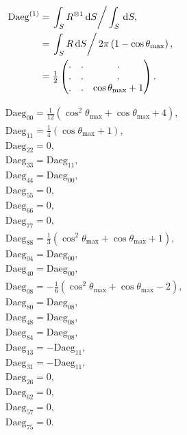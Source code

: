 \documentclass[a4paper,11pt,twoside,openright]{book}
\def\lthtmlcheckvsize{\ifdim\ht\sizebox<\vsize 
  \ifdim\wd\sizebox<\hsize\expandafter\hfill\fi \expandafter\vfill
  \else\expandafter\vss\fi}%
\begin{document}
{\newpage\clearpage
\setcounter{equation}{35}
%
\begin{subequations}\begin{align}
\textrm{Daeg}^{(1)}&= \left. \int_S R^{\otimes 1} \,\mathrm{d}S \right / \int_S \,\mathrm{d}S , \\
&= \left. \int_S R \,\mathrm{d}S \right / 2\pi \left( 1 - \cos\theta_{\textrm{max}}\right) , \\
&= \tfrac{1}{2}\begin{pmatrix}
. & . & . \\
. & . & . \\
. & . & \cos\theta_{\textrm{max}}+ 1 \\
\end{pmatrix} .
\end{align}\end{subequations}%
\lthtmldisplayZ
\lthtmlcheckvsize\clearpage}

{\newpage\clearpage
\setcounter{equation}{36}
%
\begin{subequations}\begin{align}
&\textrm{Daeg}_{00} = \tfrac{1}{12} \left( \cos^2\theta_{\textrm{max}}+ \cos\theta_{\textrm{max}}+ 4 \right) , \\
&\textrm{Daeg}_{11} = \tfrac{1}{4} \left( \cos\theta_{\textrm{max}}+ 1 \right) , \\
&\textrm{Daeg}_{22} = 0 , \\
&\textrm{Daeg}_{33} = \textrm{Daeg}_{11} , \\
&\textrm{Daeg}_{44} = \textrm{Daeg}_{00} , \\
&\textrm{Daeg}_{55} = 0 , \\
&\textrm{Daeg}_{66} = 0 , \\
&\textrm{Daeg}_{77} = 0 , \\
&\textrm{Daeg}_{88} = \tfrac{1}{3} \left( \cos^2\theta_{\textrm{max}}+ \cos\theta_{\textrm{max}}+ 1 \right) , \\
&\textrm{Daeg}_{04} = \textrm{Daeg}_{00} , \\
&\textrm{Daeg}_{40} = \textrm{Daeg}_{00} , \\
&\textrm{Daeg}_{08} = -\tfrac{1}{6} \left( \cos^2\theta_{\textrm{max}}+ \cos\theta_{\textrm{max}}- 2 \right) , \\
&\textrm{Daeg}_{80} = \textrm{Daeg}_{08} , \\
&\textrm{Daeg}_{48} = \textrm{Daeg}_{08} , \\
&\textrm{Daeg}_{84} = \textrm{Daeg}_{08} , \\
&\textrm{Daeg}_{13} = -\textrm{Daeg}_{11} , \\
&\textrm{Daeg}_{31} = -\textrm{Daeg}_{11} , \\
&\textrm{Daeg}_{26} = 0 , \\
&\textrm{Daeg}_{62} = 0 , \\
&\textrm{Daeg}_{57} = 0 , \\
&\textrm{Daeg}_{75} = 0 .
\end{align}\end{subequations}%
\lthtmldisplayZ
\lthtmlcheckvsize\clearpage}
\end{document}
